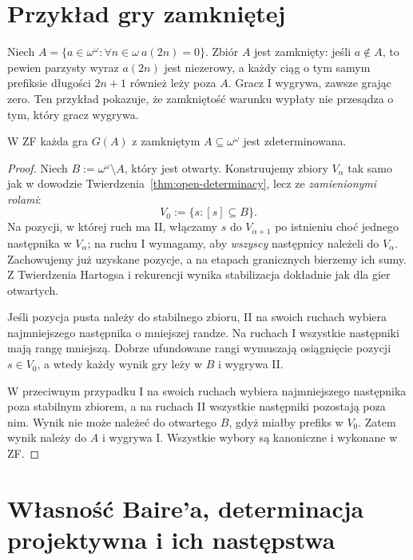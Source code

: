 \section{Przykład gry zamkniętej}
\begin{przyklad}
Niech $A=\{a\in\omega^\omega:\forall n\in\omega\ a(2n)=0\}$. Zbiór $A$ jest zamknięty: jeśli $a\notin A$, to pewien parzysty wyraz $a(2n)$ jest niezerowy, a każdy ciąg o tym samym prefiksie długości $2n+1$ również leży poza $A$. Gracz I wygrywa, zawsze grając zero. Ten przykład pokazuje, że zamkniętość warunku wypłaty nie przesądza o tym, który gracz wygrywa.
\end{przyklad}
\begin{wniosek}\label{cor:closed-determinacy}
W ZF każda gra $G(A)$ z zamkniętym
$A\subseteq\omega^\omega$ jest zdeterminowana.
\end{wniosek}
\begin{proof}
Niech $B:=\omega^\omega\setminus A$,
który jest otwarty.
Konstruujemy zbiory $V_\alpha$
tak samo jak w dowodzie
Twierdzenia~\ref{thm:open-determinacy},
lecz ze \emph{zamienionymi rolami}:
\[
V_0:=\{s:[s]\subseteq B\}.
\]
Na pozycji, w której ruch ma II,
włączamy $s$ do $V_{\alpha+1}$
po istnieniu choć jednego następnika
w $V_\alpha$;
na ruchu I wymagamy, aby
\emph{wszyscy} następnicy
należeli do $V_\alpha$.
Zachowujemy już uzyskane pozycje,
a na etapach granicznych bierzemy
ich sumy.
Z Twierdzenia Hartogsa i rekurencji
wynika stabilizacja dokładnie
jak dla gier otwartych.

Jeśli pozycja pusta należy
do stabilnego zbioru, II
na swoich ruchach wybiera
najmniejszego następnika
o mniejszej randze.
Na ruchach I wszystkie następniki
mają rangę mniejszą.
Dobrze ufundowane rangi wymuszają
osiągnięcie pozycji $s\in V_0$,
a wtedy każdy wynik gry leży w $B$
i wygrywa II.

W przeciwnym przypadku I
na swoich ruchach wybiera
najmniejszego następnika
poza stabilnym zbiorem,
a na ruchach II wszystkie
następniki pozostają poza nim.
Wynik nie może należeć do
otwartego $B$, gdyż miałby
prefiks w $V_0$.
Zatem wynik należy do $A$
i wygrywa I.
Wszystkie wybory są kanoniczne
i wykonane w ZF.
\end{proof}


\section{Własność Baire'a, determinacja projektywna i ich następstwa}
\label{sec:ad-regularity}

